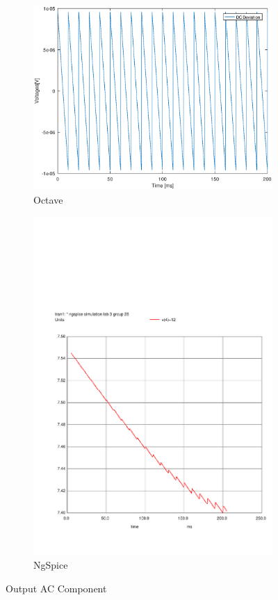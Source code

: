 \begin{figure}[H] 
\centering
\begin{subfigure}{0.4\textwidth}
\includegraphics[width=\textwidth]{DCDeviation.eps}
\caption{Octave}
\label{fig:first}
\end{subfigure}
\begin{subfigure}{0.3\textwidth}
\includegraphics[width=\textwidth]{sim31.pdf}
\caption{NgSpice}
\label{fig:second}
\end{subfigure}
\caption{Output AC Component}
\end{figure}

